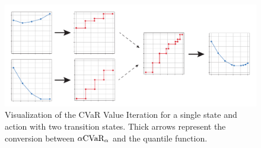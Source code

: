 \begin{figure}[h]
\center
\includegraphics[width=\linewidth]{gfx/cvar_vi_conversion.pdf}
\caption{Visualization of the CVaR Value Iteration for a single state and action with two transition states. Thick arrows represent the conversion between $\alpha\text{CVaR}_\alpha$ and the quantile function.}
\end{figure}

%
%
%
%


